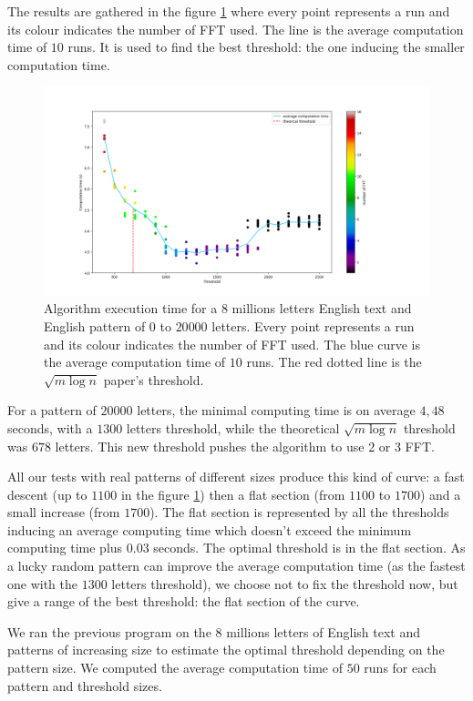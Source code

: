 \documentclass[preprint,12pt]{elsarticle}
\begin{document}
The results are gathered in the figure \ref{ExHDThresh} where
every point represents a run and its colour indicates the number of FFT used.
The line is the average computation time of $10$ runs.
It is used to find the best threshold:
the one inducing the smaller computation time.


\begin{figure}[h]
\includegraphics[scale=0.45]{./figures/ExHDThreshold.png}
\caption{Algorithm execution time for a $8$ millions letters English text
and English pattern of $0$ to $20 000$ letters.
Every point represents a run and its colour indicates the number of FFT used.
The blue curve is the average computation time of $10$ runs.
The red dotted line is the $\sqrt{m \log n}$ paper's threshold.}
\label{ExHDThresh}
\end{figure}


For a pattern of $20 000$ letters, the minimal computing time is on average $4,48$ seconds,
with a $1300$ letters threshold,
while the theoretical $\sqrt{m \log n}$ threshold was $678$ letters.
This new threshold pushes the algorithm to use $2$ or $3$ FFT.

All our tests with real patterns of different sizes produce this kind of curve:
a fast descent (up to $1100$ in the figure \ref{ExHDThresh})
then a flat section (from $1100$ to $1700$) and a small increase (from $1700$).
The flat section is represented by all the thresholds inducing an average computing time
which doesn't exceed the minimum computing time plus $0.03$ seconds.
The optimal threshold is in the flat section.
As a lucky random pattern can improve the average computation time
(as the fastest one with the $1300$ letters threshold),
we choose not to fix the threshold now, but give a range of the best threshold:
the flat section of the curve.

We ran the previous program on the $8$ millions letters of English text and patterns of increasing size
to estimate the optimal threshold depending on the pattern size.
We computed the average computation time of $50$ runs for each pattern and threshold sizes.
\end{document}
